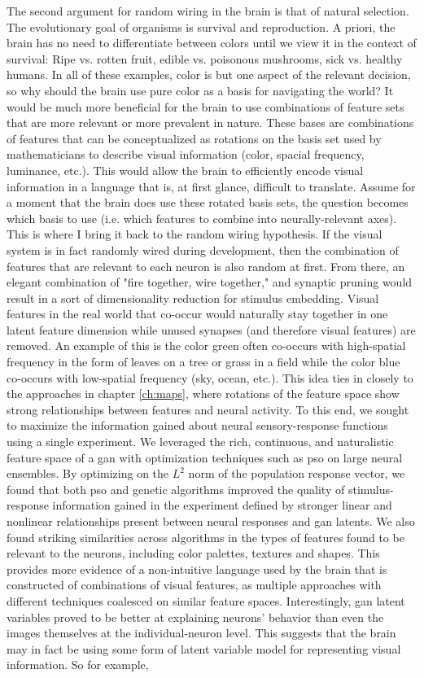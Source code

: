 The second argument for random wiring in the brain is that of natural selection. The evolutionary goal of organisms is survival and reproduction. A priori, the brain has no need to differentiate between colors until we view it in the context of survival: Ripe vs. rotten fruit, edible vs. poisonous mushrooms, sick vs. healthy humans. In all of these examples, color is but one aspect of the relevant decision, so why should the brain use pure color as a basis for navigating the world? It would be much more beneficial for the brain to use combinations of feature sets that are more relevant or more prevalent in nature. These bases are combinations of features that can be conceptualized as rotations on the basis set used by mathematicians to describe visual information (color, spacial frequency, luminance, etc.). This would allow the brain to efficiently encode visual information in a language that is, at first glance, difficult to translate. Assume for a moment that the brain does use these rotated basis sets, the question becomes which basis to use (i.e. which features to combine into neurally-relevant axes). This is where I bring it back to the random wiring hypothesis. If the visual system is in fact randomly wired during development, then the combination of features that are relevant to each neuron is also random at first. From there, an elegant combination of "fire together, wire together," and synaptic pruning would result in a sort of dimensionality reduction for stimulus embedding. Visual features in the real world that co-occur would naturally stay together in one latent feature dimension while unused synapses (and therefore visual features) are removed. An example of this is the color green often co-occurs with high-spatial frequency in the form of leaves on a tree or grass in a field while the color blue co-occurs with low-spatial frequency (sky, ocean, etc.). This idea ties in closely to the approaches in chapter \ref{ch:maps}, where rotations of the feature space show strong relationships between features and neural activity. To this end, we sought to maximize the information gained about neural sensory-response functions using a single experiment. We leveraged the rich, continuous, and naturalistic feature space of a \gls{gan} with optimization techniques such as \gls{pso} on large neural ensembles. By optimizing on the $L^2$ norm of the population response vector, we found that both \gls{pso} and genetic algorithms improved the quality of stimulus-response information gained in the experiment defined by stronger linear and nonlinear relationships present between neural responses and \gls{gan} latents. We also found striking similarities across algorithms in the types of features found to be relevant to the neurons, including color palettes, textures and shapes. This provides more evidence of a non-intuitive language used by the brain that is constructed of combinations of visual features, as multiple approaches with different techniques coalesced on similar feature spaces. Interestingly, \gls{gan} latent variables proved to be better at explaining neurons' behavior than even the images themselves at the individual-neuron level. This suggests that the brain may in fact be using some form of latent variable model for representing visual information. So for example, 